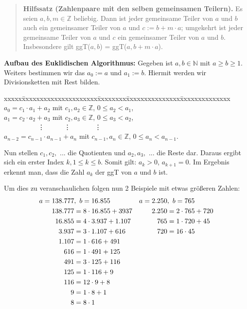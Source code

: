 \documentclass[12pt,a4paper]{article}
\theoremstyle{definition}
\begin{document}
\begin{quote}
\small
\textbf{Hilfssatz (Zahlenpaare mit den selben gemeinsamen Teilern).}
Es seien $a, b, m \in \mathbb{Z}$ beliebig. Dann ist jeder gemeinsame Teiler von $a$ und $b$ auch ein gemeinsamer Teiler von $a$ und $c := b + m \cdot a$; umgekehrt ist jeder gemeinsame Teiler von $a$ und $c$ ein gemeinsamer Teiler von $a$ und $b$.
Insbesondere gilt ggT($a, b$) = ggT($a, b + m \cdot a$).\newline
\autocite[17]{RempeGillen2009}\newpage
\end{quote}
\textbf{Aufbau des Euklidischen Algorithmus:}\newline
Gegeben ist $a, b \in \mathbb{N}$ mit $a \ge b \ge 1$.
Weiters bestimmen wir das $a_0 := a$ und $a_1 := b$.
Hiermit werden wir Divisionsketten mit Rest bilden.
\begin{tabbing}
xxxxx\=xxxxxxxxxxxxxxxxxxxxx\=xxxxxxxx\=xxxxxxxxxxxxxxx\=xxxxxxxxxxxxxx\kill
\> $a_0 = c_1 \cdot a_1 + a_2$             \> mit \> $c_1, a_2 \in \mathbb{Z}$,     \> $0 \le a_2 < a_1$,  \\
\> $a_1 = c_2 \cdot a_2 + a_3$             \> mit \> $c_2, a_3 \in \mathbb{Z}$,     \> $0 \le a_3 < a_2$,  \\
\> \ \ \ \ \ \ \ \ \ \ \vdots              \>     \>\ \ \ \ \ \vdots                \>\ \ \ \ \ \ \ \vdots \\
\> $a_{n-2} = c_{n-1} \cdot a_{n-1} + a_n$ \> mit \> $c_{n-1}, a_n \in \mathbb{Z}$, \> $0 \le a_n < a_{n-1}$.
\end{tabbing}
Nun stellen $c_1, c_2,$ ... die Quotienten und $a_2, a_3,$ ... die Reste dar. Daraus ergibt sich ein erster Index $k, 1 \le k \le b$.
Somit gilt: $a_k > 0$, $a_{k+1} = 0$.\newline
Im Ergebnis erkennt man, dass die Zahl $a_k$ der ggT von $a$ und $b$ ist.

Um dies zu veranschaulichen folgen nun 2 Beispiele mit etwas größeren Zahlen:
\begin{align}\setcounter{equation}{0}
a = 138.777 &,\ b = 16.855       & a = 2.250 &,\ b = 765 \\
138.777 &= 8 \cdot 16.855 + 3937 & 2.250 &= 2 \cdot 765 + 720 \\
16.855  &= 4 \cdot 3.937 + 1.107 & 765   &= 1 \cdot 720 + 45 \\
3.937   &= 3 \cdot 1.107 + 616   & 720   &= 16 \cdot 45 \\
1.107   &= 1 \cdot 616 + 491     &  \\
616     &= 1 \cdot 491 + 125     &  \\
491     &= 3 \cdot 125 + 116     &  \\
125     &= 1 \cdot 116 + 9       &  \\
116     &= 12 \cdot 9 + 8        &  \\
9       &= 1 \cdot 8 + 1         &  \\
8       &= 8 \cdot 1
\end{align}
\end{document}
